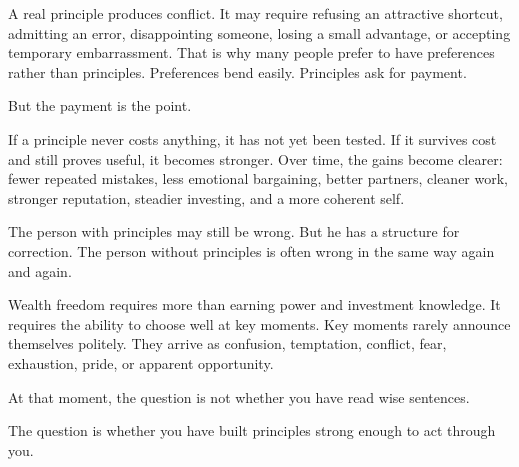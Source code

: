 A real principle produces conflict. It may require refusing an attractive shortcut, admitting an error, disappointing someone, losing a small advantage, or accepting temporary embarrassment. That is why many people prefer to have preferences rather than principles. Preferences bend easily. Principles ask for payment.

But the payment is the point.

If a principle never costs anything, it has not yet been tested. If it survives cost and still proves useful, it becomes stronger. Over time, the gains become clearer: fewer repeated mistakes, less emotional bargaining, better partners, cleaner work, stronger reputation, steadier investing, and a more coherent self.

The person with principles may still be wrong. But he has a structure for correction. The person without principles is often wrong in the same way again and again.

Wealth freedom requires more than earning power and investment knowledge. It requires the ability to choose well at key moments. Key moments rarely announce themselves politely. They arrive as confusion, temptation, conflict, fear, exhaustion, pride, or apparent opportunity.

At that moment, the question is not whether you have read wise sentences.

The question is whether you have built principles strong enough to act through you.
